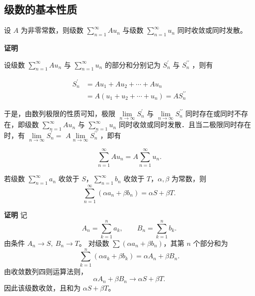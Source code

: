 \documentclass[fontset=fandol]{ctexart}
\newenvironment{custom}[1]{\par\noindent\textbf{#1}\quad}{\par\vspace{0.8em}}
\begin{document}
\subsection{级数的基本性质}


\begin{property}
	设 $A$ 为非零常数，则级数 $\sum\limits_{n = 1}^{  \infty } A u_n$ 与级数 $\sum\limits_{n = 1}^{  \infty } u_n$ 同时收敛或同时发散。
\end{property}

\begin{custom}{证明}

设级数 $\sum\limits_{n = 1}^{  \infty } A u_n$ 与 $\sum\limits_{n = 1}^{  \infty } u_n$ 的部分和分别记为 $S_n^{\prime}$ 与 $S_n^{\prime \prime}$ ，则有

$$
\begin{aligned}
	S_n^{\prime} & =A u_1+A u_2+\cdots+A u_n \\
	& =A\left(u_1+u_2+\cdots+u_n\right)=A S_n^{\prime \prime}
\end{aligned}
$$

于是，由数列极限的性质可知，极限 $\lim \limits_{n \to \infty} S_n^{\prime}$ 与 $\lim \limits_{n \to \infty} S_n^{\prime \prime}$ 同时存在或同时不存在，即级数 $\sum\limits_{n = 1}^{  \infty } A u_n$ 与 $\sum\limits_{n = 1}^{  \infty } u_n$ 同时收敛或同时发散．且当二极限同时存在时，有 $\lim \limits_{n \to \infty} S_n^{\prime}=$ $A \lim \limits_{n \to \infty} S_n^{\prime \prime}$ ，即有

$$
\sum_{n=1}^{\infty} A u_n=A \sum_{n=1}^{\infty} u_n .
$$

\end{custom}

\begin{property}[级数的线性性质]
	
	
	
若级数 \(\sum\limits_{n = 1}^{  \infty } a_n\) 收敛于 \(S\)，\(\sum\limits_{n = 1}^{  \infty } b_n\) 收敛于 \(T\)，\(\alpha, \beta\) 为常数，则
\[
\sum_{n=1}^{\infty} (\alpha a_n + \beta b_n) = \alpha S + \beta T.
\]
\end{property}

\begin{custom}{证明}
记
\[
A_n=\sum_{k=1}^{n}a_k,\qquad B_n=\sum_{k=1}^{n}b_k.
\]
由条件 $A_n\to S,\ B_n\to T$。 对级数 $\sum(\alpha a_n+\beta b_n)$，其第 $n$ 个部分和为
\[
\sum_{k=1}^{n}(\alpha a_k+\beta b_k)=\alpha A_n+\beta B_n.
\]
由收敛数列四则运算法则，
\[
\alpha A_n+\beta B_n\to \alpha S+\beta T.
\]
因此该级数收敛，且和为 $\alpha S+\beta T$。
\end{custom}
\end{document}
